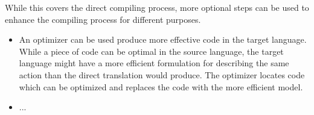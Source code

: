 While this covers the direct compiling process, more optional steps can be used to enhance the compiling process for different purposes.\\

\begin{itemize}
\item An optimizer can be used produce more effective code in the target language. While a piece of code can be optimal in the source language, the target language might have a more efficient formulation for describing the same action than the direct translation would produce. The optimizer locates code which can be optimized and replaces the code with the more efficient model.

\item...
\end{itemize}
